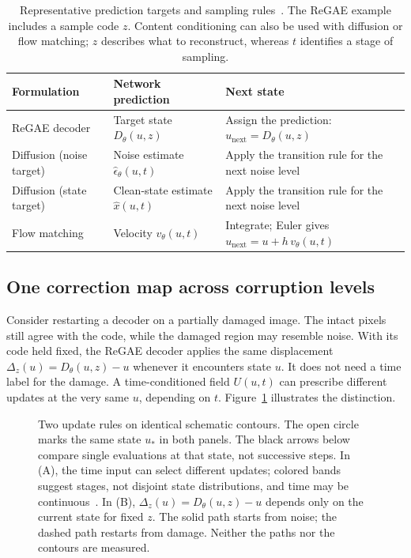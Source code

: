 \begin{table}[t]
  \centering
  \small
  \setlength{\tabcolsep}{5pt}
  \begin{tabular}{p{}p{}p{}}
    \toprule
    Formulation & Network prediction & Next state \\
    \midrule
    ReGAE decoder & Target state $D_\theta(u,z)$ & Assign the prediction: $u_{\mathrm{next}}=D_\theta(u,z)$ \\
    Diffusion (noise target) & Noise estimate $\widehat\epsilon_\theta(u,t)$ & Apply the transition rule for the next noise level \\
    Diffusion (state target) & Clean-state estimate $\widehat x(u,t)$ & Apply the transition rule for the next noise level \\
    Flow matching & Velocity $v_\theta(u,t)$ & Integrate; Euler gives $u_{\mathrm{next}}=u+h\,v_\theta(u,t)$ \\
    \bottomrule
  \end{tabular}
  \caption{Representative prediction targets and sampling rules~\cite{ddpm,chan2024,flowmatching}. The ReGAE example includes a sample code $z$. Content conditioning can also be used with diffusion or flow matching; $z$ describes what to reconstruct, whereas $t$ identifies a stage of sampling.}
  \label{tab:targets}
\end{table}

\subsection{One correction map across corruption levels}
\label{sec:geometry}

Consider restarting a decoder on a partially damaged image. The intact pixels still agree with the code, while the damaged region may resemble noise. With its code held fixed, the ReGAE decoder applies the same displacement $\Delta_z(u)=D_\theta(u,z)-u$ whenever it encounters state $u$. It does not need a time label for the damage. A time-conditioned field $U(u,t)$ can prescribe different updates at the very same $u$, depending on $t$. Figure~\ref{fig:time-fields} illustrates the distinction.

\begin{figure}[t]
  \centering
  
  \caption{Two update rules on identical schematic contours. The open circle marks the same state $u_*$ in both panels. The black arrows below compare single evaluations at that state, not successive steps. In (A), the time input can select different updates; colored bands suggest stages, not disjoint state distributions, and time may be continuous~\cite{sde}. In (B), $\Delta_z(u)=D_\theta(u,z)-u$ depends only on the current state for fixed $z$. The solid path starts from noise; the dashed path restarts from damage. Neither the paths nor the contours are measured.}
  \label{fig:time-fields}
\end{figure}

